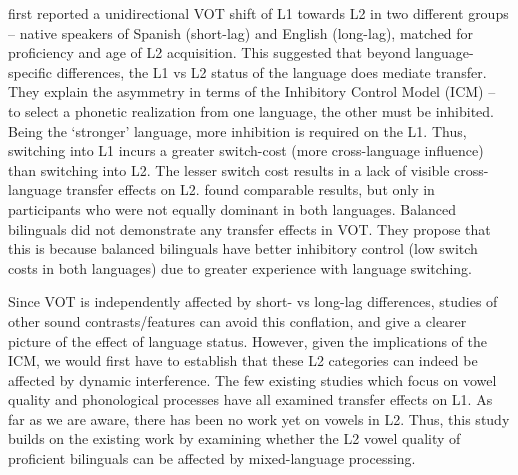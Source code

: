 \documentclass[charis,linguex]{glossa}
\begin{document}
\cite{olson2013bilingual} first reported a unidirectional VOT shift of L1 towards L2 in two different groups -- native speakers of Spanish (short-lag) and English (long-lag), matched for proficiency and age of L2 acquisition. This suggested that beyond language-specific differences, the L1 vs L2 status of the language does mediate transfer. They explain the asymmetry in terms of the Inhibitory Control Model (ICM) \citep{green1998mental} -- to select a phonetic realization from one language, the other must be inhibited. Being the `stronger' language, more inhibition is required on the L1. Thus, switching into L1 incurs a greater switch-cost (more cross-language influence) than switching into L2. The lesser switch cost results in a lack of visible cross-language transfer effects on L2. \cite{tsui2019impact} found comparable results, but only in participants who were not equally dominant in both languages. Balanced bilinguals did not demonstrate any transfer effects in VOT. They propose that this is because balanced bilinguals have better inhibitory control (low switch costs in both languages) due to greater experience with language switching.

Since VOT is independently affected by short- vs long-lag differences, studies of other sound contrasts/features can avoid this conflation, and give a clearer picture of the effect of language status. However, given the implications of the ICM, we would first have to establish that these L2 categories can indeed be affected by dynamic interference. The few existing studies which focus on vowel quality \citep{simonet2014phonetic,muldner2019phonetics,elias2017effects} and phonological processes \citep{simonet2020increased,schwartz2015language} have all examined transfer effects on L1. As far as we are aware, there has been no work yet on vowels in L2. Thus, this study builds on the existing work by examining whether the L2 vowel quality of proficient bilinguals can be affected by mixed-language processing.
\end{document}
